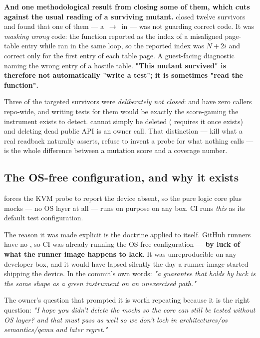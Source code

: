 \documentclass[10.5pt]{article}
\begin{document}
\textbf{And one methodological result from closing some of them, which cuts against the usual
reading of a surviving mutant.}  closed twelve  survivors and
found that one of them — a \code{+}\,$\rightarrow$\,\code{*} in  — was not
guarding correct code. It was \emph{masking wrong} code: the function reported  as the index of a misaligned page-table entry while  ran in the same loop,
so the reported index was $N + 2i$ and correct only for the first entry of each table page. A
guest-facing diagnostic naming the wrong entry of a hostile table. \textbf{"This mutant survived"
is therefore not automatically "write a test"; it is sometimes "read the function".}

Three of the targeted survivors were \emph{deliberately not closed}: 
and  have zero callers repo-wide, and writing tests for them would be exactly the
score-gaming the instrument exists to detect.  cannot simply be deleted
( requires it once  exists) and deleting dead
public API is an owner call. That distinction — kill what a real readback naturally asserts,
refuse to invent a probe for what nothing calls — is the whole difference between a mutation score
and a coverage number.

\subsection{The OS-free configuration, and why it exists}

 forces the KVM probe to report the device absent, so the pure logic
core plus mocks — no OS layer at all — runs on purpose on any box. CI runs \emph{this} as its
default test configuration.

The reason it was made explicit is the doctrine applied to itself. GitHub runners have no
, so CI was already running the OS-free configuration — \textbf{by luck of what
the runner image happens to lack}. It was unreproducible on any developer box, and it would have
lapsed silently the day a runner image started shipping the device. In the commit's own words:
\emph{"a guarantee that holds by luck is the same shape as a green instrument on an unexercised
path."}

The owner's question that prompted it is worth repeating because it is the right question:
\emph{"I hope you didn't delete the mocks so the core can still be tested without OS layer? and
that must pass as well so we don't lock in architectures/os semantics/qemu and later regret."}
\end{document}

